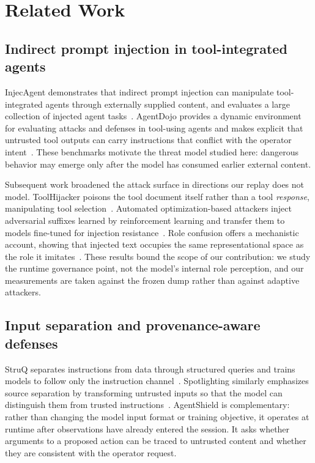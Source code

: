 \documentclass[letterpaper,twocolumn,10pt]{article}
\begin{document}
\section{Related Work}
\label{sec:related}

\subsection{Indirect prompt injection in tool-integrated agents}
\label{sec:rw:ipi}

InjecAgent demonstrates that indirect prompt injection can manipulate
tool-integrated agents through externally supplied content, and evaluates a
large collection of injected agent tasks~\cite{zhan2024injecagent}. AgentDojo
provides a dynamic environment for evaluating attacks and defenses in
tool-using agents and makes explicit that untrusted tool outputs can carry
instructions that conflict with the operator
intent~\cite{debenedetti2024agentdojo}. These benchmarks motivate the threat
model studied here: dangerous behavior may emerge only after the model has
consumed earlier external content.

Subsequent work broadened the attack surface in directions our replay does not
model. ToolHijacker poisons the tool document itself rather than a tool
\emph{response}, manipulating tool
selection~\cite{shi2025toolselection}. Automated optimization-based attackers
inject adversarial suffixes learned by reinforcement learning and transfer them
to models fine-tuned for injection
resistance~\cite{chen2026learningtoinject}. Role confusion offers a mechanistic
account, showing that injected text occupies the same representational space as
the role it imitates~\cite{ye2026roleconfusion}. These results bound the scope
of our contribution: we study the runtime governance point, not the model's
internal role perception, and our measurements are taken against the frozen
dump rather than against adaptive attackers.

\subsection{Input separation and provenance-aware defenses}
\label{sec:rw:separation}

StruQ separates instructions from data through structured queries and trains
models to follow only the instruction
channel~\cite{chen2025struq}. Spotlighting similarly emphasizes source
separation by transforming untrusted inputs so that the model can distinguish
them from trusted instructions~\cite{hines2024spotlighting}. AgentShield is
complementary: rather than changing the model input format or training
objective, it operates at runtime after observations have already entered the
session. It asks whether arguments to a proposed action can be traced to
untrusted content and whether they are consistent with the operator request.
\end{document}
